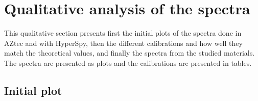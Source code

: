 













\section{Qualitative analysis of the spectra}
\label{sec:results:qualitative}


This qualitative section presents first the initial plots of the spectra done in AZtec and with HyperSpy, then the different calibrations and how well they match the theoretical values, and finally the spectra from the studied materials.
The spectra are presented as plots and the calibrations are presented in tables.



\subsection{Initial plot}
\label{sec:results:qualitative:initial_plot}

